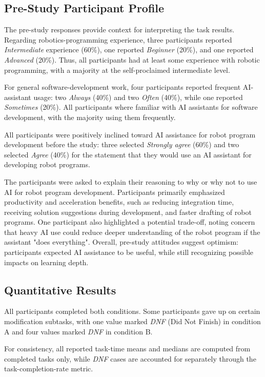 \subsection{Pre-Study Participant Profile}
The pre-study responses provide context for interpreting the task results. Regarding robotics-programming experience, three participants reported \textit{Intermediate} experience (60\%), one reported \textit{Beginner} (20\%), and one reported \textit{Advanced} (20\%). Thus, all participants had at least some experience with robotic programming, with a majority at the self-proclaimed intermediate level.

For general software-development work, four participants reported frequent AI-assistant usage: two \textit{Always} (40\%) and two \textit{Often} (40\%), while one reported \textit{Sometimes} (20\%). All participants where familiar with AI assistants for software development, with the majority using them frequently.

All participants were positively inclined toward AI assistance for robot program development before the study: three selected \textit{Strongly agree} (60\%) and two selected \textit{Agree} (40\%) for the statement that they would use an AI assistant for developing robot programs.

The participants were asked to explain their reasoning to why or why not to use AI for robot program development. Participants primarily emphasized productivity and acceleration benefits, such as reducing integration time, receiving solution suggestions during development, and faster drafting of robot programs. One participant also highlighted a potential trade-off, noting concern that heavy AI use could reduce deeper understanding of the robot program if the assistant "does everything". Overall, pre-study attitudes suggest optimism: participants expected AI assistance to be useful, while still recognizing possible impacts on learning depth.


\subsection{Quantitative Results}
All participants completed both conditions. Some participants gave up on certain modification subtasks, with one value marked \textit{DNF} (Did Not Finish) in condition A and four values marked \textit{DNF} in condition B.

For consistency, all reported task-time means and medians are computed from completed tasks only, while \textit{DNF} cases are accounted for separately through the task-completion-rate metric.

